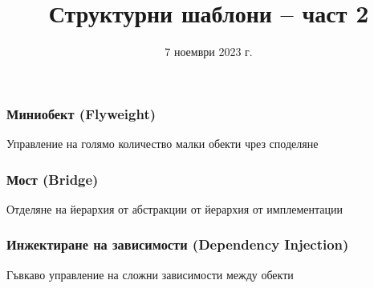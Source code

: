 \documentclass[alsotrans]{beamerswitch}
\title{Структурни шаблони -- част 2}
\date{7 ноември 2023 г.}
\begin{document}
\begin{frame}
  \titlepage
\end{frame}

\begin{frame}
  \frametitle{Миниобект (Flyweight)}

  \begin{purpose}
    Управление на голямо количество малки обекти чрез споделяне
  \end{purpose}
\end{frame}

\begin{frame}
  \frametitle{Мост (Bridge)}

  \begin{purpose}
    Отделяне на йерархия от абстракции от йерархия от имплементации
  \end{purpose}
\end{frame}

\begin{frame}
  \frametitle{Инжектиране на зависимости (Dependency Injection)}

  \begin{purpose}
    Гъвкаво управление на сложни зависимости между обекти
  \end{purpose}
\end{frame}
\end{document}
